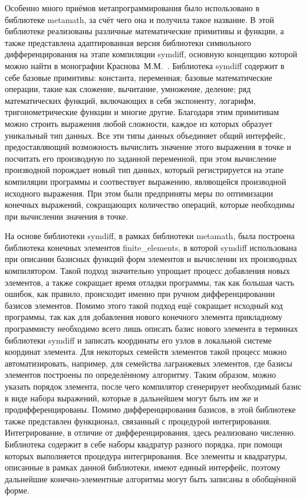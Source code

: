 Особенно много приёмов метапрограммирования было использовано в библиотеке metamath, за счёт чего она и получила такое название. В этой библиотеке реализованы различные математические примитивы и функции, а также представлена адаптированная версия библиотеки символьного дифференцирования на этапе компиляции symdiff, основную концепцию которой можно найти в монографии Краснова~М.М.~\cite{KrasnovMeta}. Библиотека symdiff содержит в себе базовые примитивы: константа, переменная; базовые математические операции, такие как  сложение, вычитание, умножение, деление; ряд математических функций, включающих в себя экспоненту, логарифм, тригонометрические функции и многие другие. Благодаря этим примитивам можно строить выражения любой сложности, каждое из которых образует уникальный тип данных. Все эти типы данных объединяет общий интерфейс, предоставляющий возможность вычислить значение этого выражения в точке и посчитать его производную по заданной переменной, при этом вычисление производной порождает новый тип данных, который регистрируется на этапе компиляции программы и соотвествует выражению, являющейся производной исходного выражения. При этом были предприняты меры по оптимизации конечных выражений, сокращающих количество операций, которые необходимы при вычислении значения в точке.

На основе библиотеки symdiff, в рамках библиотеки metamath, была построена библиотека конечных элементов finite\_elements, в которой symdiff использована при описании базисных функций форм элементов и вычислении их производных компилятором. Такой подход значительно упрощает процесс добавления новых элементов, а также сокращает время отладки программы, так как большая часть ошибок, как правило, происходит именно при ручном дифференцировании базисов элементов. Помимо этого такой подход ещё сокращает исходный код программы, так как для добавления нового конечного элемента прикладному программисту необходимо всего лишь описать базис нового элемента в терминах библиотеки symdiff и записать координаты его узлов в локальной системе координат элемента. Для некоторых семейств элементов такой процесс можно автоматизировать, например, для семейства лагранжевых элементов, где базисы элементов построены по определённому алгоритму. Таким образом, можно указать порядок элемента, после чего компилятор сгенерирует необходимый базис в виде набора выражений, которые в дальнейшем могут быть им же и продифференцированы. Помимо дифференцирования базисов, в этой библиотеке также представлен функционал, связанный с процедурой интегрирования. Интегрирование, в отличие от дифференцирования, здесь реализовано численно. Библиотека содержит в себе наборы квадратур разного порядка, при помощи которых выполняется процедура интегрирования. Все элементы и квадратуры, описанные в рамках данной библиотеки, имеют единый интерфейс, поэтому дальнейшие конечно-элементные алгоритмы могут быть записаны в обобщённой форме.

